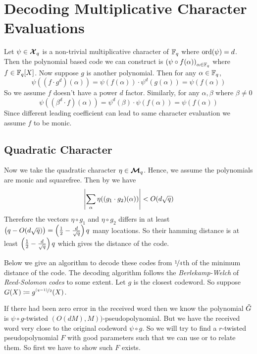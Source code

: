 \section{Decoding Multiplicative Character Evaluations}
%
Let $\psi\in \boldsymbol{\mathcal{X}}_q$ is a non-trivial multiplicative character of $\mathbb{F}_q$ where $\operatorname{ord}(\psi)=d$. Then the polynomial based code we can construct is $\left(\psi\circ f(\alpha)\right)_{\alpha\in \mathbb{F}_q}$ where $f\in\mathbb{F}_q[X]$. Now suppose $g$ is another polynomial. Then for any $\alpha\in\mathbb{F}_q$, $$\psi((f\cdot g^d)(\alpha))=\psi(f(\alpha))\cdot \psi^d(g(\alpha))=\psi(f(\alpha))$$So we assume $f$ doesn't have a power $d$ factor. Similarly, for any $\alpha,\beta$ where $\beta\neq 0$ $$\psi((\beta^{d}\cdot f)(\alpha))=\psi^d(\beta)\cdot \psi(f(\alpha))=\psi(f(\alpha))$$Since different leading coefficient can lead to same character evaluation we assume $f$ to be monic.

\subsection{Quadratic Character}
Now we take the quadratic character $\eta\in\boldsymbol{\mathcal{M}}_q$. Hence, we assume the polynomials are monic and squarefree. Then by \WeilBoundPsiNondthm we have $$\left|\sum_{\alpha}\eta((g_1\cdot g_2)(\alpha))\right|< O(d\sqrt{q})$$Therefore the vectors $\eta\circ g_1$ and $\eta\circ g_2$ differs in at least $\left(q-O(d\sqrt{q})\right)=\left(\frac12-\frac{d}{\sqrt{q}}\right)q$ many locations. So their hamming distance is at least $\left(\frac12-\frac{d}{\sqrt{q}}\right)q$ which gives the distance of the code.

Below we give an algorithm to decode these codes from $\nicefrac14$th of the minimum distance of the code. The decoding algorithm follows the \emph{Berlekamp-Welch} of \emph{Reed-Solomon codes} to some extent. Let $g$ is the closest codeword. So suppose $G(X)\coloneqq g^{\nicefrac{(q-1)}2}(X)$.

If there had been zero error in the received word then we know the polynomial $\tilde{G}$ is $\psi\circ g$-twisted $(O(dM),M))$-pseudopolynomial. But we have the received word very close to the original codeword $\psi\circ g$. So we will try to find a $r$-twisted pseudopolynomial $F$ with good parameters such that we can use \TwistedTwolem or \TwistedRobustTwothm to relate them. So first we have to show such $F$ exists.

